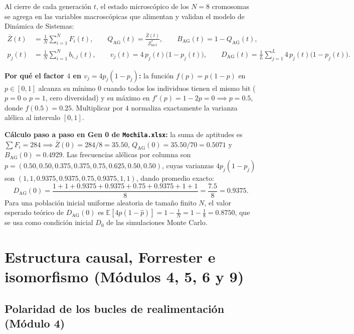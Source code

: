 \documentclass[11pt,a4paper]{article}
\begin{document}
Al cierre de cada generaci\'on $t$, el estado microsc\'opico de los $N=8$ cromosomas se agrega en las variables macrosc\'opicas que alimentan y validan el modelo de Din\'amica de Sistemas:
\begin{align}
\bar{Z}(t) &= \frac{1}{N}\sum_{i=1}^{N} F_i(t), \qquad
Q_{\text{AG}}(t) = \frac{\bar{Z}(t)}{Z^*_{\text{fact}}}, \qquad
B_{\text{AG}}(t) = 1 - Q_{\text{AG}}(t), \\[4pt]
p_j(t) &= \frac{1}{N}\sum_{i=1}^{N} b_{i,j}(t), \qquad
v_j(t) = 4\,p_j(t)\big(1 - p_j(t)\big), \qquad
D_{\text{AG}}(t) = \frac{1}{L}\sum_{j=1}^{L} 4\,p_j(t)\big(1 - p_j(t)\big).
\end{align}

\textbf{Por qu\'e el factor $4$ en $v_j = 4p_j(1-p_j)$:} la funci\'on $f(p) = p(1-p)$ en $p \in [0,1]$ alcanza su m\'inimo $0$ cuando todos los individuos tienen el mismo bit ($p=0$ o $p=1$, cero diversidad) y su m\'aximo en $f'(p) = 1 - 2p = 0 \implies p = 0.5$, donde $f(0.5) = 0.25$. Multiplicar por $4$ normaliza exactamente la varianza al\'elica al intervalo $[0,1]$.

\textbf{C\'alculo paso a paso en Gen 0 de \texttt{Mochila.xlsx}:} la suma de aptitudes es $\sum F_i = 284 \implies \bar{Z}(0) = 284/8 = 35.50$, $Q_{\text{AG}}(0) = 35.50/70 = 0.5071$ y $B_{\text{AG}}(0) = 0.4929$. Las frecuencias al\'elicas por columna son $p = (0.50, 0.50, 0.375, 0.375, 0.75, 0.625, 0.50, 0.50)$, cuyas varianzas $4p_j(1-p_j)$ son $(1, 1, 0.9375, 0.9375, 0.75, 0.9375, 1, 1)$, dando promedio exacto:
\[
D_{\text{AG}}(0) = \frac{1 + 1 + 0.9375 + 0.9375 + 0.75 + 0.9375 + 1 + 1}{8} = \frac{7.5}{8} = 0.9375.
\]
Para una poblaci\'on inicial uniforme aleatoria de tama\~no finito $N$, el valor esperado te\'orico de $D_{\text{AG}}(0)$ es $\mathbb{E}[4\hat{p}(1-\hat{p})] = 1 - \frac{1}{N} = 1 - \frac{1}{8} = 0.8750$, que se usa como condici\'on inicial $D_0$ de las simulaciones Monte Carlo.

\section{Estructura causal, Forrester e isomorfismo (M\'odulos 4, 5, 6 y 9)}

\subsection{Polaridad de los bucles de realimentaci\'on (M\'odulo 4)}
\end{document}

